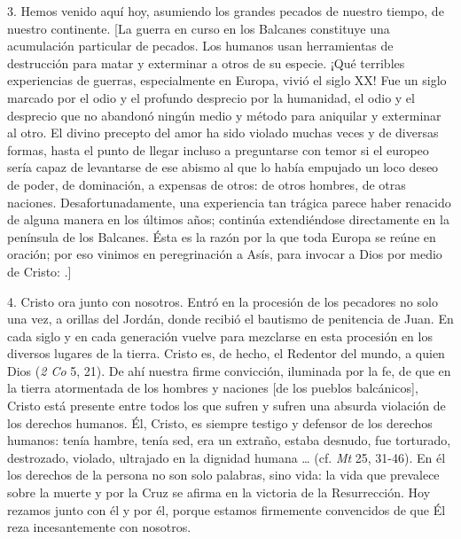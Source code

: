 \begin{body}
					3. Hemos venido aquí hoy, asumiendo los grandes pecados de nuestro tiempo, de nuestro continente. {[}La guerra en curso en los Balcanes constituye una acumulación particular de pecados. Los humanos usan herramientas de destrucción para matar y exterminar a otros de su especie. ¡Qué terribles experiencias de guerras, especialmente en Europa, vivió el siglo XX! Fue un siglo marcado por el odio y el profundo desprecio por la humanidad, el odio y el desprecio que no abandonó ningún medio y método para aniquilar y exterminar al otro. El divino precepto del amor ha sido violado muchas veces y de diversas formas, hasta el punto de llegar incluso a preguntarse con temor si el europeo sería capaz de levantarse de ese abismo al que lo había empujado un loco deseo de poder, de dominación, a expensas de otros: de otros hombres, de otras naciones. Desafortunadamente, una experiencia tan trágica parece haber renacido de alguna manera en los últimos años; continúa extendiéndose directamente en la península de los Balcanes. Ésta es la razón por la que toda Europa se reúne en oración; por eso vinimos en peregrinación a Asís, para invocar a Dios por medio de Cristo: .{]}
					
					4. Cristo ora junto con nosotros. Entró en la procesión de los pecadores no solo una vez, a orillas del Jordán, donde recibió el bautismo de penitencia de Juan. En cada siglo y en cada generación vuelve para mezclarse en esta procesión en los diversos lugares de la tierra. Cristo es, de hecho, el Redentor del mundo, a quien Dios  (\emph{2 Co} 5, 21). De ahí nuestra firme convicción, iluminada por la fe, de que en la tierra atormentada de los hombres y naciones {[}de los pueblos balcánicos{]}, Cristo está presente entre todos los que sufren y sufren una absurda violación de los derechos humanos. Él, Cristo, es siempre testigo y defensor de los derechos humanos: tenía hambre, tenía sed, era un extraño, estaba desnudo, fue torturado, destrozado, violado, ultrajado en la dignidad humana \ldots{} (cf. \emph{Mt} 25, 31-46). En él los derechos de la persona no son solo palabras, sino vida: la vida que prevalece sobre la muerte y por la Cruz se afirma en la victoria de la Resurrección. Hoy rezamos junto con él y por él, porque estamos firmemente convencidos de que Él reza incesantemente con nosotros.
					

\end{body}
